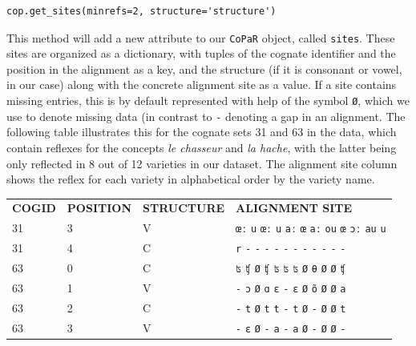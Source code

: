 \documentclass[
  a4paper,
  14pt,
  oneside,
  tablecaptionabove
]{scrbook}
\newcommand{\passthrough}[1]{#1}
\begin{document}
\begin{lstlisting}
cop.get_sites(minrefs=2, structure='structure')
\end{lstlisting}

This method will add a new attribute to our
\passthrough{\lstinline!CoPaR!} object, called
\passthrough{\lstinline!sites!}. These sites are organized as a
dictionary, with tuples of the cognate identifier and the position in
the alignment as a key, and the structure (if it is consonant or vowel,
in our case) along with the concrete alignment site as a value. If a
site contains missing entries, this is by default represented with help
of the symbol \passthrough{\lstinline!Ø!}, which we use to denote
missing data (in contrast to \passthrough{\lstinline!-!} denoting a gap
in an alignment. The following table illustrates this for the cognate
sets 31 and 63 in the data, which contain reflexes for the concepts
\emph{le chasseur} and \emph{la hache}, with the latter being only
reflected in 8 out of 12 varieties in our dataset. The alignment site
column shows the reflex for each variety in alphabetical order by the
variety name.


\begin{table}[]
\begin{tabular}{llll}
\textbf{COGID} & \textbf{POSITION} & \textbf{STRUCTURE} & \textbf{ALIGNMENT SITE} \\
31    & 3        & V         & \texttt{œː} \texttt{u}  \texttt{œː}  \texttt{u}   \texttt{aː}  \texttt{œ}  \texttt{aː}  \texttt{ou}  \texttt{œ}  \texttt{ɔː}  \texttt{au}  \texttt{u}    \\
31    & 4        & C         & \texttt{r}  \texttt{-}  \texttt{-}   \texttt{-}   \texttt{-}   \texttt{-}  \texttt{-}   \texttt{-}   \texttt{-}  \texttt{-}   \texttt{-}  \texttt{-}     \\
63    & 0        & C         & \texttt{ʦ}  \texttt{ʧ}  \texttt{Ø}   \texttt{ʧ}  \texttt{ʦ}   \texttt{ʦ}  \texttt{ʦ}   \texttt{Ø}   \texttt{θ}  \texttt{Ø}   \texttt{Ø}  \texttt{ʧ}    \\
63    & 1        & V         & \texttt{-}  \texttt{ɔ}  \texttt{Ø}   \texttt{ɑ}   \texttt{ɛ}   \texttt{-}  \texttt{ɛ}   \texttt{Ø}  \texttt{õ}  \texttt{Ø}   \texttt{Ø}  \texttt{a}     \\
63    & 2        & C         & \texttt{-}  \texttt{t}  \texttt{Ø}   \texttt{t}   \texttt{t}   \texttt{-}  \texttt{t}   \texttt{Ø}   \texttt{-}  \texttt{Ø}   \texttt{Ø}  \texttt{t}     \\
63    & 3        & V         & \texttt{-}  \texttt{ɛ}  \texttt{Ø}   \texttt{-}   \texttt{a}   \texttt{-}  \texttt{a}   \texttt{Ø}   \texttt{-}  \texttt{Ø}   \texttt{Ø}  \texttt{-}       
\end{tabular}
\end{table}
\end{document}

